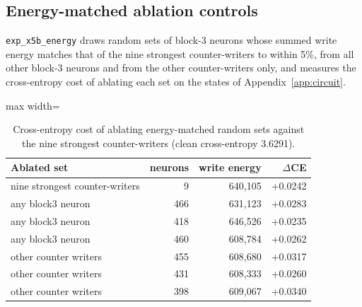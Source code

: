 \subsection{Energy-matched ablation controls}\label{app:x5b}
\texttt{exp\_x5b\_energy} draws random sets of block-3 neurons whose summed write energy matches that of the nine strongest counter-writers to within 5\%, from all other block-3 neurons and from the other counter-writers only, and measures the cross-entropy cost of ablating each set on the states of Appendix~\ref{app:circuit}.
\begin{table}[H]\centering\scriptsize
\caption{Cross-entropy cost of ablating energy-matched random sets against the nine strongest counter-writers (clean cross-entropy 3.6291).}\label{app:x5b-table}
\begin{adjustbox}{max width=\linewidth}
\begin{tabular}{lrrr}\toprule
Ablated set & neurons & write energy & $\Delta$CE \\ \midrule
nine strongest counter-writers & 9 & 640,105 & +0.0242 \\
any block3 neuron & 466 & 631,123 & +0.0283 \\
any block3 neuron & 418 & 646,526 & +0.0235 \\
any block3 neuron & 460 & 608,784 & +0.0262 \\
other counter writers & 455 & 608,680 & +0.0317 \\
other counter writers & 431 & 608,333 & +0.0260 \\
other counter writers & 398 & 609,067 & +0.0340 \\
\bottomrule\end{tabular}\end{adjustbox}
\end{table}

